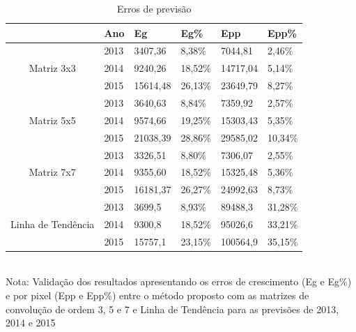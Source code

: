 \begin{table}[h]
	\centering
	\caption{Erros de previsão}
	\label{tbl:forecastErrors}
	\begin{tabular}{l|l|l|l|l|l|}
		\cline{2-6}
		& Ano  & Eg & Eg\% & Epp & Epp\% \\ \hline
		\multicolumn{1}{|c|}{\multirow{3}{*}{Matriz 3x3}}         & 2013 & 3407,36  & 8,38\%  & 7044,81  & 2,46\%  \\ \cline{2-6} 
		\multicolumn{1}{|c|}{}                                    & 2014 & 9240,26  & 18,52\% & 14717,04 & 5,14\%  \\ \cline{2-6} 
		\multicolumn{1}{|c|}{}                                    & 2015 & 15614,48 & 26,13\% & 23649,79 & 8,27\%  \\ \hline
		\multicolumn{1}{|c|}{\multirow{3}{*}{Matriz 5x5}}         & 2013 & 3640,63  & 8,84\%  & 7359,92  & 2,57\%  \\ \cline{2-6} 
		\multicolumn{1}{|c|}{}                                    & 2014 & 9574,66  & 19,25\% & 15303,43 & 5,35\%  \\ \cline{2-6} 
		\multicolumn{1}{|c|}{}                                    & 2015 & 21038,39 & 28,86\% & 29585,02 & 10,34\% \\ \hline
		\multicolumn{1}{|c|}{\multirow{3}{*}{Matriz 7x7}}         & 2013 & 3326,51  & 8,80\%  & 7306,07  & 2,55\%  \\ \cline{2-6} 
		\multicolumn{1}{|c|}{}                                    & 2014 & 9355,60  & 18,52\% & 15325,48 & 5,36\%  \\ \cline{2-6} 
		\multicolumn{1}{|c|}{}                                    & 2015 & 16181,37 & 26,27\% & 24992,63 & 8,73\%  \\ \hline
		\multicolumn{1}{|c|}{\multirow{3}{*}{Linha de Tendência}} & 2013 & 3699,5   & 8,93\%  & 89488,3  & 31,28\% \\ \cline{2-6} 
		\multicolumn{1}{|c|}{}                                    & 2014 & 9300,8   & 18,52\% & 95026,6  & 33,21\% \\ \cline{2-6} 
		\multicolumn{1}{|c|}{}                                    & 2015 & 15757,1  & 23,15\% & 100564,9 & 35,15\% \\ \hline
	\end{tabular}
	\\[10pt]
	Nota: Validação dos resultados apresentando os erros de crescimento (Eg e Eg\%) e por pixel (Epp e Epp\%) entre o método proposto com as matrizes de convolução de ordem 3, 5 e 7 e Linha de Tendência para as previsões de 2013, 2014 e 2015
\end{table}


